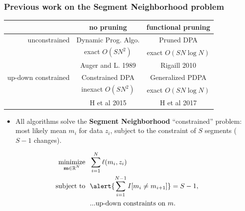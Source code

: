 \documentclass{beamer}
\DeclareMathOperator*{\minimize}{minimize}
\newcommand{\RR}{\mathbb R}
\begin{document}
\begin{frame}
  \frametitle{Previous work on the Segment Neighborhood problem}
  \begin{tabular}{r|c|c}
    & no pruning & functional pruning \\
    \hline
    unconstrained & Dynamic Prog. Algo. & Pruned DPA \\
     & exact $O(SN^2)$ & exact $O(SN\log N)$\\
    & Auger and L. 1989 & Rigaill 2010\\
    \hline
    up-down constrained & Constrained DPA & Generalized PDPA \\
     & inexact $O(SN^2)$ & exact $O(SN\log N)$\\
    & H et al 2015 & H et al 2017\\
    \hline
  \end{tabular}
  \begin{itemize}
  \item All algorithms solve the \textbf{Segment Neighborhood}
    ``constrained'' problem: most likely mean $m_i$ for data $z_i$,
    subject to the constraint of $S$ segments ($S-1$ changes).
  \end{itemize} 
\begin{align*}
    \minimize_{\substack{
  \mathbf m\in\RR^{N}
  }} &\ \ 
    \sum_{i=1}^N \ell( m_i,  z_i) 
\\
      \text{subject to} &\ \ {\alert{\sum_{i=1}^{N-1} I[m_i\neq m_{i+1}]}=S-1,}
  \nonumber\\
  &\ \ \text{...up-down constraints on $m$.}
  \nonumber 
\end{align*}
\end{frame}
\end{document}
